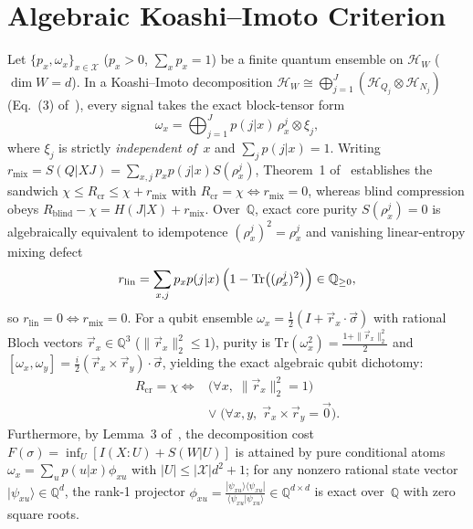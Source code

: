 \documentclass[11pt,twocolumn]{article}
\newcommand{\QQ}{\mathbb{Q}}
\newcommand{\Tr}{\mathrm{Tr}}
\begin{document}
\section{Algebraic Koashi--Imoto Criterion}\label{sec:prelim}
Let $\{p_x, \omega_x\}_{x \in \mathcal{X}}$ ($p_x > 0$, $\sum_x p_x = 1$) be a finite quantum ensemble on $\mathcal{H}_W$ ($\dim W = d$). In a Koashi--Imoto decomposition $\mathcal{H}_W \cong \bigoplus_{j=1}^J (\mathcal{H}_{Q_j} \otimes \mathcal{H}_{N_j})$ (Eq.~(3) of~\cite{polloreno2026koashi}), every signal takes the exact block-tensor form
\begin{equation}
  \omega_x = \bigoplus_{j=1}^J p(j|x)\,\rho_x^j \otimes \xi_j,
  \label{eq:ki-decomp}
\end{equation}
where $\xi_j$ is strictly \emph{independent of~$x$} and $\sum_j p(j|x) = 1$. Writing $r_{\mathrm{mix}} = S(Q|XJ) = \sum_{x,j} p_x p(j|x) S(\rho_x^j)$, Theorem~1 of~\cite{polloreno2026koashi} establishes the sandwich $\chi \le R_{\mathrm{cr}} \le \chi + r_{\mathrm{mix}}$ with $R_{\mathrm{cr}} = \chi \iff r_{\mathrm{mix}} = 0$, whereas blind compression obeys $R_{\mathrm{blind}} - \chi = H(J|X) + r_{\mathrm{mix}}$. Over~$\QQ$, exact core purity $S(\rho_x^j) = 0$ is algebraically equivalent to idempotence $(\rho_x^j)^2 = \rho_x^j$ and vanishing linear-entropy mixing defect
\begin{equation}
  r_{\mathrm{lin}} = \sum_{x,j} p_x p(j|x)\,\Bigl(1 - \Tr\bigl((\rho_x^j)^2\bigr)\Bigr) \in \QQ_{\ge 0},
  \label{eq:rlin}
\end{equation}
so $r_{\mathrm{lin}} = 0 \iff r_{\mathrm{mix}} = 0$. For a qubit ensemble $\omega_x = \frac{1}{2}(I + \vec{r}_x \cdot \vec{\sigma})$ with rational Bloch vectors $\vec{r}_x \in \QQ^3$ ($\|\vec{r}_x\|_2^2 \le 1$), purity is $\Tr(\omega_x^2) = \frac{1+\|\vec{r}_x\|_2^2}{2}$ and $[\omega_x, \omega_y] = \frac{i}{2}(\vec{r}_x \times \vec{r}_y)\cdot\vec{\sigma}$, yielding the exact algebraic qubit dichotomy:
\begin{equation}
\begin{aligned}
  R_{\mathrm{cr}} = \chi \iff{}&
  \bigl(\forall x,\; \|\vec{r}_x\|_2^2 = 1\bigr) \\
  &\lor\; \bigl(\forall x,y,\; \vec{r}_x \times \vec{r}_y = \vec{0}\bigr).
\end{aligned}
  \label{eq:qubit-dichotomy}
\end{equation}
Furthermore, by Lemma~3 of~\cite{polloreno2026koashi}, the decomposition cost $F(\sigma) = \inf_U [I(X:U) + S(W|U)]$ is attained by pure conditional atoms $\omega_x = \sum_u p(u|x)\phi_{xu}$ with $|U| \le |\mathcal{X}| d^2 + 1$; for any nonzero rational state vector $|\psi_{xu}\rangle \in \QQ^d$, the rank-1 projector $\phi_{xu} = \frac{|\psi_{xu}\rangle\langle\psi_{xu}|}{\langle\psi_{xu}|\psi_{xu}\rangle} \in \QQ^{d\times d}$ is exact over~$\QQ$ with zero square roots.
\end{document}
